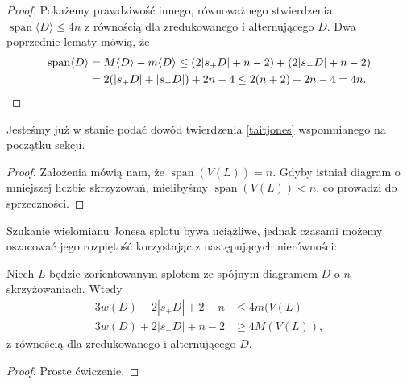 \begin{proof}
    Pokażemy prawdziwość innego, równoważnego stwierdzenia: $\operatorname{span} \langle D\rangle\le 4n$
    z równością dla zredukowanego i alternującego $D$.
    Dwa poprzednie lematy mówią, że
    \begin{align*}
        \operatorname{span}\langle D\rangle
        & = M\langle D\rangle - m\langle D\rangle \le (2|s_+D|+n-2)+(2|s_-D|+n-2) \\
        & = 2(|s_+D|+|s_- D|)+2n-4 \le 2(n+2)+2n-4 = 4n. \qedhere
    \end{align*}
\end{proof}

Jesteśmy już w stanie podać dowód twierdzenia \ref{taitjones} wspomnianego na początku sekcji.

\begin{proof}
    Założenia mówią nam, że $\operatorname{span} (V(L)) = n$.
    Gdyby istniał diagram o mniejszej liczbie skrzyżowań,
    mielibyśmy $\operatorname{span} (V(L)) < n$, co prowadzi do sprzeczności.
\end{proof}

Szukanie wielomianu Jonesa splotu bywa uciążliwe,
jednak czasami możemy oszacować jego rozpiętość korzystając z następujących nierówności:

\begin{corollary}
    Niech $L$ będzie zorientowanym splotem ze spójnym diagramem $D$ o $n$ skrzyżowaniach.
    Wtedy
    \begin{align*}
        3w(D)-2|s_+D|+2-n & \le 4 m(V(L) \\
        3w(D)+2|s_-D|+n-2 & \ge 4 M(V(L)),
    \end{align*}
    z równością dla zredukowanego i alternującego $D$.
\end{corollary}

\begin{proof}
    Proste ćwiczenie.
\end{proof}

